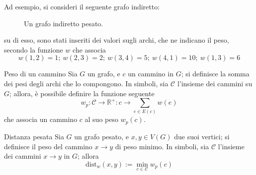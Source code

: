 \documentclass[a4paper, 12pt]{report}
\begin{document}
    \begin{example}
        Ad esempio, si consideri il seguente grafo indiretto:

        \begin{figure}[H]
            \centering
            \caption{Un grafo indiretto pesato.}
        \end{figure}

        su di esso, sono stati inseriti dei valori sugli archi, che ne indicano il peso, secondo la funzione $w$ che associa $$w(1, 2) = 1; \ w(2,3)=2; \ w(3, 4)=5; \ w(4, 1)=10; \ w(1,3)=6$$
    \end{example}

    \begin{frameddefn}{Peso di un cammino}
        Sia $G$ un grafo, e $c$ un cammino in $G$; si definisce  la somma dei pesi degli archi che lo compongono. In simboli, sia $\mathcal {C}$ l'insieme dei cammini su $G$; allora, è possibile definire la funzione seguente $$w_p : \mathcal{C} \rightarrow \mathbb{R}^+: c \rightarrow \displaystyle \sum_{e \in E(c)}{w(e)}$$ che associa un cammino $c$ al suo peso $w_p(c)$.
    \end{frameddefn}

    \begin{frameddefn}{Distanza pesata}
        Sia $G$ un grafo pesato, e $x, y \in V(G)$ due suoi vertici; si definisce  il peso del cammino $x \rightarrow y$ di peso minimo. In simboli, sia $\mathcal{C}$ l'insieme dei cammini $x \rightarrow y$ in $G$; allora $$\mathrm{dist}_w(x, y) := \min_{c \in \mathcal{C}}{w_p(c)}$$
    \end{frameddefn}
\end{document}
